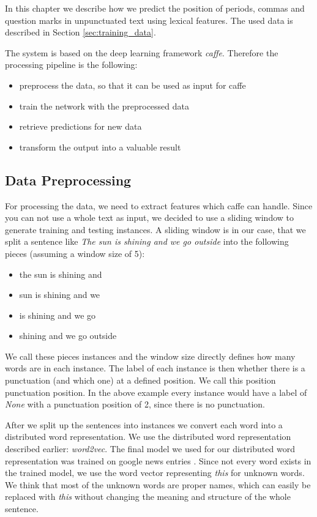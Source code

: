 In this chapter we describe how we predict the position of periods, commas and question marks in unpunctuated text using lexical features.
The used data is described in Section \ref{sec:training_data}.

The system is based on the deep learning framework \emph{caffe}.
Therefore the processing pipeline is the following:

\begin{itemize}
\item preprocess the data, so that it can be used as input for caffe
\item train the network with the preprocessed data
\item retrieve predictions for new data
\item transform the output into a valuable result
\end{itemize}

\subsection{Data Preprocessing}

For processing the data, we need to extract features which caffe can handle.
Since you can not use a whole text as input, we decided to use a sliding window to generate training and testing instances.
A sliding window is in our case, that we split a sentence like \emph{The sun is shining and we go outside} into the following pieces (assuming a window size of 5):
\begin{itemize}
\item the sun is shining and
\item sun is shining and we
\item is shining and we go
\item shining and we go outside
\end{itemize}

We call these pieces instances and the window size directly defines how many words are in each instance.
The label of each instance is then whether there is a punctuation (and which one) at a defined position.
We call this position punctuation position.
In the above example every instance would have a label of \emph{None} with a punctuation position of 2, since there is no punctuation.

After we split up the sentences into instances we convert each word into a distributed word representation.
We use the distributed word representation described earlier: \emph{word2vec}. 
The final model we used for our distributed word representation was trained on google news entries .
Since not every word exists in the trained model, we use the word vector representing \emph{this} for unknown words.
We think that most of the unknown words are proper names, which can easily be replaced with \emph{this} without changing the meaning and structure of the whole sentence.

